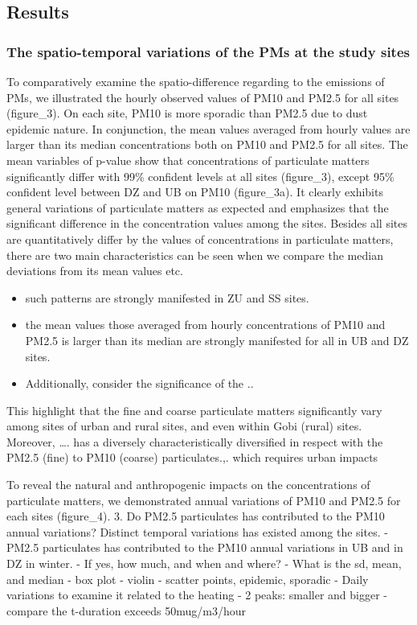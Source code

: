 \documentclass[
  11pt,
]{article}
\providecommand{\tightlist}{%
  \setlength{\itemsep}{0pt}\setlength{\parskip}{0pt}}
\begin{document}
\subsection{Results}\label{results}

\subsubsection{The spatio-temporal variations of the PMs at the study
sites}\label{the-spatio-temporal-variations-of-the-pms-at-the-study-sites}

To comparatively examine the spatio-difference regarding to the
emissions of PMs, we illustrated the hourly observed values of PM10 and
PM2.5 for all sites (figure\_3). On each site, PM10 is more sporadic
than PM2.5 due to dust epidemic nature. In conjunction, the mean values
averaged from hourly values are larger than its median concentrations
both on PM10 and PM2.5 for all sites. The mean variables of p-value show
that concentrations of particulate matters significantly differ with
99\% confident levels at all sites (figure\_3), except 95\% confident
level between DZ and UB on PM10 (figure\_3a). It clearly exhibits
general variations of particulate matters as expected and emphasizes
that the significant difference in the concentration values among the
sites. Besides all sites are quantitatively differ by the values of
concentrations in particulate matters, there are two main
characteristics can be seen when we compare the median deviations from
its mean values etc.

\begin{itemize}
\tightlist
\item
  such patterns are strongly manifested in ZU and SS sites.\\
\item
  the mean values those averaged from hourly concentrations of PM10 and
  PM2.5 is larger than its median are strongly manifested for all in UB
  and DZ sites.
\item
  Additionally, consider the significance of the ..
\end{itemize}

This highlight that the fine and coarse particulate matters
significantly vary among sites of urban and rural sites, and even within
Gobi (rural) sites. Moreover, \ldots. has a diversely characteristically
diversified in respect with the PM2.5 (fine) to PM10 (coarse)
particulates.,. which requires urban impacts

To reveal the natural and anthropogenic impacts on the concentrations of
particulate matters, we demonstrated annual variations of PM10 and PM2.5
for each sites (figure\_4). 3. Do PM2.5 particulates has contributed to
the PM10 annual variations? Distinct temporal variations has existed
among the sites. - PM2.5 particulates has contributed to the PM10 annual
variations in UB and in DZ in winter. - If yes, how much, and when and
where? - What is the sd, mean, and median - box plot - violin - scatter
points, epidemic, sporadic - Daily variations to examine it related to
the heating - 2 peaks: smaller and bigger - compare the t-duration
exceeds 50mug/m3/hour
\end{document}
